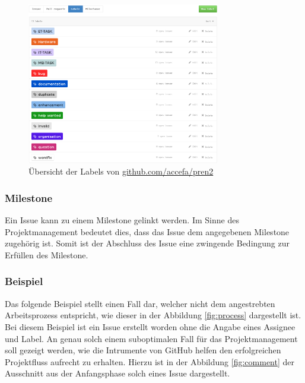 \begin{figure}[h!]
	\centering
	\includegraphics[width=0.75\textwidth]{../../fig/github/labels.png}
	\caption{Übersicht der Labels von \url{github.com/accefa/pren2}}
	\label{fig:labels}
\end{figure}

\subsubsection{Milestone}
Ein \gls{Issue} kann zu einem \gls{Milestone} gelinkt werden. Im Sinne des
Projektmanagement bedeutet dies, dass das \gls{Issue} dem angegebenen
\gls{Milestone} zugehörig ist. Somit ist der Abschluss des \gls{Issue}
eine zwingende Bedingung zur Erfüllen des \gls{Milestone}.

\clearpage
\subsubsection{Beispiel}
Das folgende Beispiel stellt einen Fall dar, welcher nicht dem angestrebten
Arbeitsprozess entspricht, wie dieser in der Abbildung \ref{fig:process}
dargestellt ist. Bei diesem Beispiel ist ein \gls{Issue} erstellt worden ohne
die Angabe eines \gls{Assignee} und \gls{Label}. An genau solch einem
suboptimalen Fall für das Projektmanagement soll gezeigt werden, wie die
Intrumente von GitHub helfen den erfolgreichen Projektfluss aufrecht zu
erhalten. Hierzu ist in der Abbildung \ref{fig:comment} der Ausschnitt aus der
Anfangsphase solch eines \gls{Issue} dargestellt.

